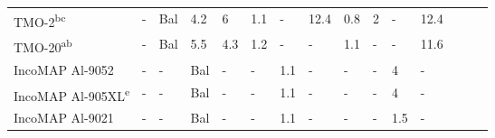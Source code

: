 \begin{table}[]
{\begin{tabular}{lllllllllllllll}
		TMO-2\textsuperscript{bc}               & -            & Bal         & 4.2         & 6           & 1.1           & -          & 12.4       & 0.8         & 2           & -           & 12.4                       &\cite{RN1177}  \\
		TMO-20\textsuperscript{ab}              & -            & Bal         & 5.5         & 4.3         & 1.2           & -          & -          & 1.1         & -           & -           & 11.6                       &\cite{RN969}  \\
		IncoMAP  Al-9052      & -            & -           & Bal         & -           & -             & 1.1        & -          & -           & -           & 4           & -                          &\cite{RN1177}  \\
		IncoMAP Al-905XL\textsuperscript{e}     & -            & -           & Bal         & -           & -             & 1.1        & -          & -           & -           & 4           & -                          &\cite{RN1177}  \\
		IncoMAP Al-9021       & -            & -           & Bal         & -           & -             & 1.1        & -          & -           & -           & 1.5         & -                          &\cite{RN1177} 
	\end{tabular}%
}
\label{tab:nonferrousodscomp}
\end{table}

